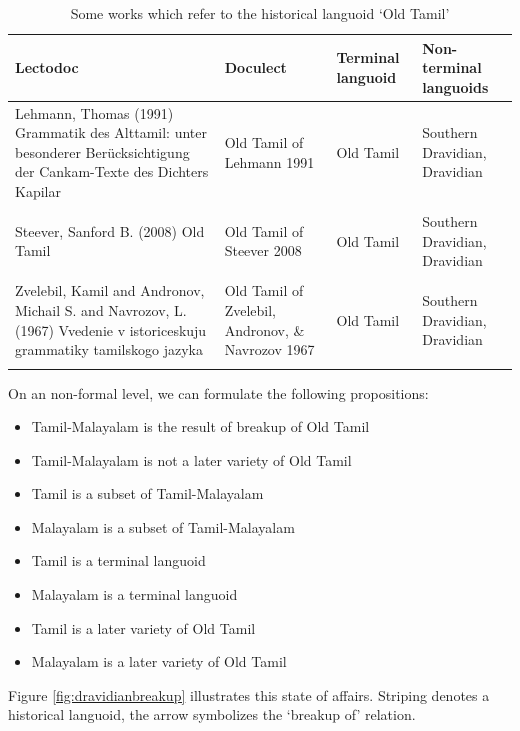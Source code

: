 \documentclass[a4paper,10pt]{article}
\begin{document}
\begin{table}
\begin{tabular}{p{5cm}p{2cm}p{2cm}p{4cm}}
Lectodoc & Doculect & Terminal languoid & Non-terminal languoids\\ 
\hline
Lehmann, Thomas  (1991) Grammatik des Alttamil: unter besonderer Berücksichtigung der Cankam-Texte des Dichters Kapilar & Old Tamil of Lehmann 1991 & Old Tamil & Southern Dravidian, Dravidian \\\\
Steever, Sanford B.  (2008) Old Tamil & Old Tamil of Steever 2008 & Old Tamil & Southern Dravidian, Dravidian \\\\
Zvelebil, Kamil and Andronov, Michail S. and Navrozov, L.  (1967) Vvedenie v istoriceskuju grammatiky tamilskogo jazyka & Old Tamil of Zvelebil, Andronov, \& Navrozov 1967 & Old Tamil & Southern Dravidian, Dravidian \\\\
\end{tabular}
\caption{Some works which refer to the historical languoid `Old Tamil'}
\label{tab:nonterminallanguoid}
\end{table}

On an non-formal level, we can formulate the following propositions:

\begin{itemize}
 \item Tamil-Malayalam is the result of breakup of Old Tamil
 \item Tamil-Malayalam is not a later variety of Old Tamil
 \item Tamil is a subset of Tamil-Malayalam
 \item Malayalam is a subset of Tamil-Malayalam
 \item Tamil is a terminal languoid
 \item Malayalam is a terminal languoid
 \item Tamil is a later variety of Old Tamil
 \item Malayalam is a later variety of Old Tamil
\end{itemize}

Figure \ref{fig:dravidianbreakup} illustrates this state of affairs. Striping denotes a historical languoid, the arrow symbolizes the `breakup of' relation.
\end{document}
